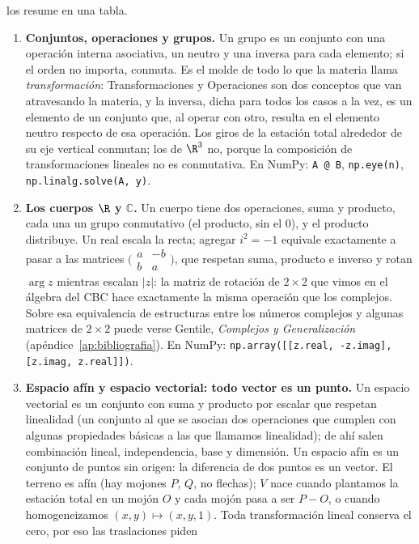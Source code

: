 los resume en una tabla. \begin{enumerate}
  \item \textbf{Conjuntos, operaciones y grupos.} Un grupo es un conjunto con una
  operación interna asociativa, un neutro y una inversa para cada elemento; si el orden no
  importa, conmuta. Es el molde de todo lo que la materia llama \emph{transformación}:
  Transformaciones y Operaciones son dos conceptos que van atravesando la
  materia, y la inversa, dicha para todos los casos a la vez,
  es un elemento de un conjunto que, al operar con otro, resulta en el elemento neutro
  respecto de esa operación. Los giros de la estación total
  alrededor de su eje vertical conmutan; los de \(\R^3\) no, porque la composición de
  transformaciones lineales no es conmutativa. En NumPy:
  \texttt{A @ B}, \texttt{np.eye(n)}, \texttt{np.linalg.solve(A, y)}.
  \item \textbf{Los cuerpos \(\R\) y \(\mathbb{C}\).} Un cuerpo tiene dos operaciones, suma
  y producto, cada una un grupo conmutativo (el producto, sin el \(0\)), y el producto
  distribuye. Un real escala la recta; agregar \(i^2=-1\) equivale exactamente a pasar a las
  matrices \(\bigl(\begin{smallmatrix}a&-b\\ b&a\end{smallmatrix}\bigr)\), que respetan
  suma, producto e inverso y rotan \(\arg z\) mientras escalan \(|z|\): la matriz de
  rotación de \(2\times2\) que vimos en el álgebra del CBC hace exactamente la misma operación que
  los complejos. Sobre esa equivalencia de estructuras entre los números complejos y algunas
  matrices de \(2\times2\) puede verse Gentile, \emph{Complejos y Generalización}
  (apéndice~\ref{ap:bibliografia}). En NumPy:
  \texttt{np.array([[z.real, -z.imag], [z.imag, z.real]])}.
  \item \textbf{Espacio afín y espacio vectorial: todo vector es un punto.} Un espacio
  vectorial es un conjunto con suma y producto por escalar que respetan linealidad (un
  conjunto al que se asocian dos operaciones que cumplen con algunas propiedades
  básicas a las que llamamos linealidad); de ahí salen
  combinación lineal, independencia, base y dimensión. Un espacio afín es un conjunto de
  puntos sin origen: la diferencia de dos puntos es un vector. El terreno es afín (hay
  mojones \(P\), \(Q\), no flechas); \(V\) nace cuando plantamos la estación total en un mojón
  \(O\) y cada mojón pasa a ser \(P-O\), o cuando homogeneizamos \((x,y)\mapsto(x,y,1)\). Toda
  transformación lineal conserva el cero, por eso las traslaciones piden

\end{enumerate}
